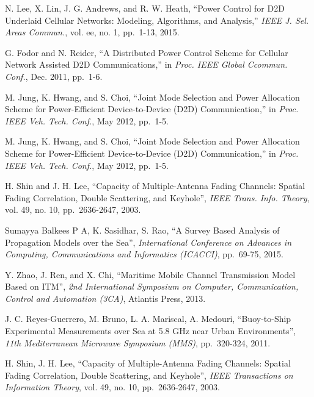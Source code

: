 \documentclass{ieeeaccess}
\begin{document}
\begin{thebibliography}{10}
  N. Lee, X. Lin, J. G. Andrews, and R. W. Heath, ``Power Control for D2D Underlaid Cellular Networks: Modeling, Algorithms, and Analysis,''
  \emph{IEEE J. Sel. Areas Commun.}, vol. ee, no. 1, pp.~1-13, 2015.

  G. Fodor and N. Reider, ``A Distributed Power Control Scheme for Cellular Network Assisted D2D Communications,'' in
  \emph{Proc. IEEE Global Ccommun. Conf.}, Dec. 2011, pp.~1-6.

  M. Jung, K. Hwang, and S. Choi, ``Joint Mode Selection and Power Allocation Scheme for Power-Efficient Device-to-Device (D2D) Communication,'' in
  \emph{Proc. IEEE Veh. Tech. Conf.}, May 2012, pp.~1-5.
  
  M. Jung, K. Hwang, and S. Choi, ``Joint Mode Selection and Power Allocation Scheme for Power-Efficient Device-to-Device (D2D) Communication,'' in
  \emph{Proc. IEEE Veh. Tech. Conf.}, May 2012, pp.~1-5.

  H. Shin and J. H. Lee, ``Capacity of Multiple-Antenna Fading Channels: Spatial Fading Correlation, Double Scattering, and Keyhole'',
  \emph{IEEE Trans. Info. Theory}, vol. 49, no. 10, pp.~2636-2647, 2003.

  Sumayya Balkees P A, K. Sasidhar, S. Rao, ``A Survey Based Analysis of Propagation Models over the Sea'',
  \emph{International Conference on Advances in Computing, Communications and Informatics (ICACCI)}, pp.~69-75, 2015.
  
  Y. Zhao, J. Ren, and X. Chi, ``Maritime Mobile Channel Transmission Model Based on ITM'',
  \emph{2nd International Symposium on Computer, Communication, Control and Automation (3CA)}, Atlantis Press, 2013.
  
  J. C. Reyes-Guerrero, M. Bruno, L. A. Mariscal, A. Medouri, ``Buoy-to-Ship Experimental Measurements over Sea at 5.8 GHz near Urban Environments'',
  \emph{11th Mediterranean Microwave Symposium (MMS)}, pp.~320-324, 2011.


  H. Shin, J. H. Lee, ``Capacity of Multiple-Antenna Fading Channels: Spatial Fading Correlation, Double Scattering, and Keyhole'',
  \emph{IEEE Transactions on Information Theory}, vol. 49, no. 10, pp.~2636-2647, 2003.


\end{thebibliography}
\end{document}
